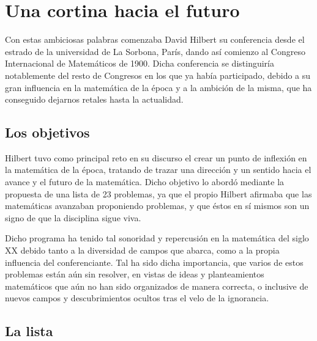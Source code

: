
\chapter{Una cortina hacia el futuro}\label{ch:Hilbert-1}

Con estas ambiciosas palabras comenzaba David Hilbert su conferencia desde el estrado de la universidad de La Sorbona, París, dando
así comienzo al Congreso Internacional de Matemáticos de 1900.
Dicha conferencia se distinguiría notablemente del resto de Congresos en los que ya había participado, debido a su gran influencia 
en la matemática de la época y a la ambición de la misma, que ha conseguido dejarnos retales hasta la actualidad. 


\section{Los objetivos}

Hilbert tuvo como principal reto en su discurso el crear un punto de inflexión en la matemática de la época, tratando de trazar 
una dirección y un sentido hacia el avance y el futuro de la matemática. Dicho objetivo lo abordó mediante la propuesta de una lista de 
23 problemas, ya que el propio Hilbert afirmaba que las matemáticas avanzaban proponiendo problemas, y que éstos en sí mismos 
son un signo de que la disciplina sigue viva.

Dicho programa ha tenido tal sonoridad y repercusión en la matemática del siglo XX debido tanto a la diversidad de campos que abarca, 
como a la propia influencia del conferenciante. Tal ha sido dicha importancia, que varios de estos problemas están aún sin resolver, 
en vistas de ideas y planteamientos matemáticos que aún no han sido organizados de manera correcta, o inclusive de nuevos campos y 
descubrimientos ocultos tras el velo de la ignorancia.


\section{La lista}

